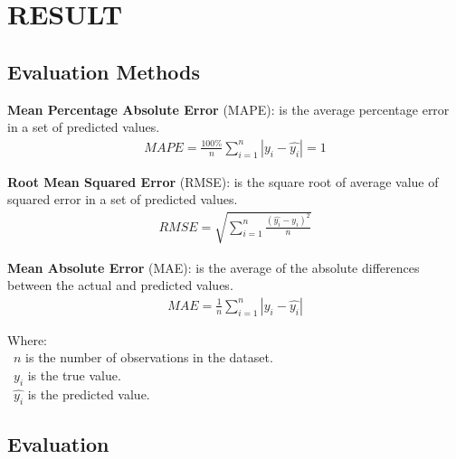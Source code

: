 \documentclass[conference]{IEEEtran}
\begin{document}
\section{RESULT}

\subsection{Evaluation Methods}
\textbf{Mean Percentage Absolute Error} (MAPE): is the average percentage error in a set of predicted values.\\
\begin{align*}
    MAPE=\frac{100\%}{n}  \sum_{i=1}^{n} |y_i-\hat{y_i} |  = 1 
\end{align*}

\textbf{Root Mean Squared Error} (RMSE): is the square root of average value of squared error in a set of predicted values.\\
\begin{align*}
RMSE=\sqrt{\sum_{i=1}^{n} \frac{(\hat{y_i}-y_i )^2}{n} }
\end{align*}

\textbf{Mean Absolute Error} (MAE): is the average of the absolute differences between the actual and predicted values.
\begin{align*}
MAE = \frac{1}{n} \sum_{i=1}^{n} \left| y_i - \hat{y_i} \right| 
\end{align*}

Where: \\
	\indent\textbullet\ \(n\) is the number of observations in the dataset.\\
	\indent\textbullet\ \(y_i\)  is the true value.\\
	\indent\textbullet\ \(\hat{y_i}\) is the predicted value.

\subsection{Evaluation} 
\end{document}
